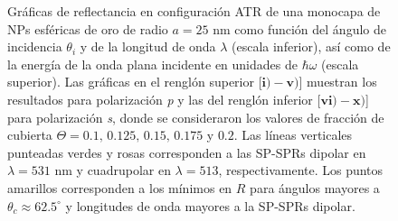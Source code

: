 \begin{figure}[t!]
\vspace*{-.5em}	
	\caption{Gráficas de reflectancia en configuración ATR  de una monocapa de NPs esféricas de oro de radio $a=25$ nm como función del ángulo de incidencia $\theta_i$ y de la longitud de onda $\lambda$ (escala inferior), así como de la energía de la onda plana incidente en unidades de $\hbar\omega$ (escala superior).  Las gráficas   en el renglón superior [$\mathbf{i)-v)}$] muestran los resultados para  polarización \emph{p} y las del renglón inferior  [$\mathbf{vi)-x)}$]  para polarización  \emph{s}, donde se consideraron los valores de fracción de cubierta $\Theta =  0.1,\,0.125,\,0.15,\, 0.175$ y $0.2$.  Las líneas verticales punteadas verdes y rosas corresponden a las SP-SPRs dipolar en $\lambda=531$ nm y  cuadrupolar en $\lambda=513$, respectivamente.  Los puntos amarillos corresponden a los mínimos en $R$ para ángulos mayores a $\theta_c\approx 62.5^\circ$ y longitudes de onda mayores a la SP-SPRs dipolar.
}	\label{fig:Au-R-Theta}	
	\end{figure}	

